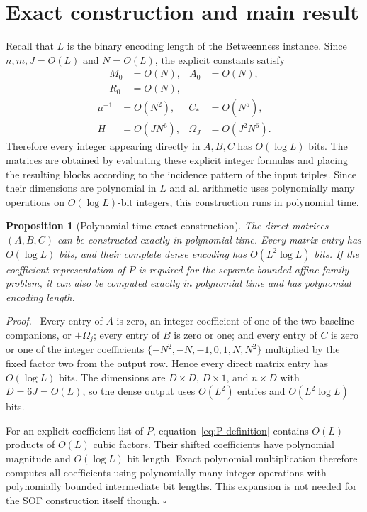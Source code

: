 \documentclass[final,5p,times,twocolumn]{elsarticle}
\newtheorem{proposition}[theorem]{Proposition}
\newenvironment{proof}[1][Proof]
  {\par\smallskip\noindent\textit{#1.}\ }
  {\hfill$\square$\par\smallskip}
\begin{document}
\section{Exact construction and main result}\label{sec:complexity}

Recall that $L$ is the binary encoding length of the Betweenness instance. Since $n,m,J=O(L)$ and $N=O(L)$, the explicit constants satisfy
\[
\begin{aligned}
M_0&=O(N),& A_0&=O(N),\\
R_0&=O(N),
\end{aligned}
\]
\[
\begin{aligned}
\mu^{-1}&=O(N^2),& C_*&=O(N^5),\\
H&=O(JN^6),& \Omega_J&=O(J^2N^6).
\end{aligned}
\]
Therefore every integer appearing directly in $A,B,C$ has $O(\log L)$ bits.
The matrices are obtained by evaluating these explicit integer formulas and placing the resulting blocks according to the incidence pattern of the input triples. Since their dimensions are polynomial in $L$ and all arithmetic uses polynomially many operations on $O(\log L)$-bit integers, this construction runs in polynomial time.

\begin{proposition}[Polynomial-time exact construction]\label{prop:coeff-growth}
The direct matrices $(A,B,C)$ can be constructed exactly in polynomial time. Every matrix entry has $O(\log L)$ bits, and their complete dense encoding has $O(L^2\log L)$ bits. If the coefficient representation of $P$ is required for the separate bounded affine-family problem, it can also be computed exactly in polynomial time and has polynomial encoding length.
\end{proposition}

\begin{proof}
Every entry of $A$ is zero, an integer coefficient of one of the two baseline companions, or $\pm\Omega_j$; every entry of $B$ is zero or one; and every entry of $C$ is zero or one of the integer coefficients $\{-N^2,-N,-1,0,1,N,N^2\}$ multiplied by the fixed factor two from the output row. Hence every direct matrix entry has $O(\log L)$ bits. The dimensions are $D\times D$, $D\times1$, and $n\times D$ with $D=6J=O(L)$, so the dense output uses $O(L^2)$ entries and $O(L^2\log L)$ bits.

For an explicit coefficient list of $P$, equation~\eqref{eq:P-definition} contains $O(L)$ products of $O(L)$ cubic factors. Their shifted coefficients have polynomial magnitude and $O(\log L)$ bit length. Exact polynomial multiplication therefore computes all coefficients using polynomially many integer operations with polynomially bounded intermediate bit lengths. This expansion is not needed for the SOF construction itself though.
\end{proof}
\end{document}
